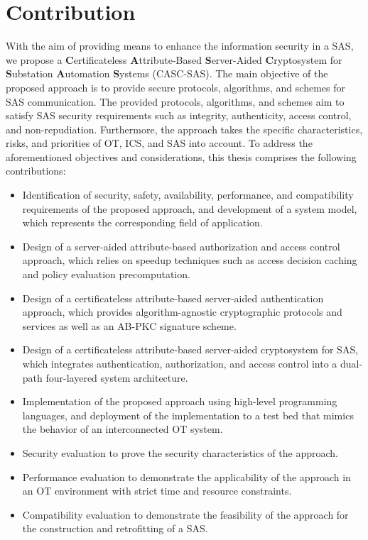 \section{Contribution}
\label{sec:introduction:contribution}
With the aim of providing means to enhance the information security in a SAS, we propose a \textbf{C}ertificateless \textbf{A}ttribute-Based \textbf{S}erver-Aided \textbf{C}ryptosystem for \textbf{S}ubstation \textbf{A}utomation \textbf{S}ystems (CASC-SAS).
The main objective of the proposed approach is to provide secure protocols, algorithms, and schemes for SAS communication.
The provided protocols, algorithms, and schemes aim to satisfy SAS security requirements such as integrity, authenticity, access control, and non-repudiation.
Furthermore, the approach takes the specific characteristics, risks, and priorities of OT, ICS, and SAS into account.
To address the aforementioned objectives and considerations, this thesis comprises the following contributions:
\begin{itemize}
    \item Identification of security, safety, availability, performance, and compatibility requirements of the proposed approach, and development of a system model, which represents the corresponding field of application.
    \item Design of a server-aided attribute-based authorization and access control approach, which relies on speedup techniques such as access decision caching and policy evaluation precomputation.
    \item Design of a certificateless attribute-based server-aided authentication approach, which provides algorithm-agnostic cryptographic protocols and services as well as an AB-PKC signature scheme.
    \item Design of a certificateless attribute-based server-aided cryptosystem for SAS, which integrates authentication, authorization, and access control into a dual-path four-layered system architecture.
    \item Implementation of the proposed approach using high-level programming languages, and deployment of the implementation to a test bed that mimics the behavior of an interconnected OT system.
    \item Security evaluation to prove the security characteristics of the approach.
    \item Performance evaluation to demonstrate the applicability of the approach in an OT environment with strict time and resource constraints.
    \item Compatibility evaluation to demonstrate the feasibility of the approach for the construction and retrofitting of a SAS.
\end{itemize}

